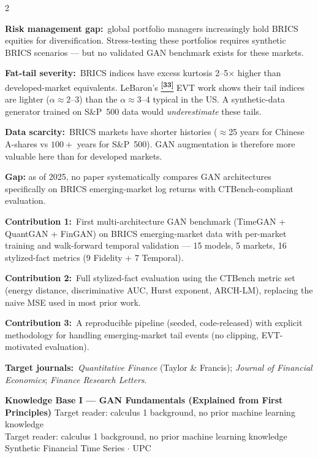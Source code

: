 \documentclass[10pt]{article}
\newcommand{\greenbox}[2]{\begin{tcolorbox}[mybox={FGreen}{GBg},title={#1}]#2\end{tcolorbox}}
\newcommand{\redbox}[2]{\begin{tcolorbox}[mybox={DRed}{RBg},title={#1}]#2\end{tcolorbox}}
\newcommand{\pagehead}[2]{%
  \begin{tcolorbox}[enhanced,arc=0pt,outer arc=0pt,boxrule=0pt,
    colback=Navy,colframe=Navy,
    top=5pt,bottom=5pt,left=8pt,right=8pt,
    before skip=0pt,after skip=10pt]
  {\color{white}\large\bfseries #1}%
  \ifx\relax#2\relax\else\\[1pt]{\color{blue!30!white}\small #2}\fi
  \hfill{\color{blue!20!white}\footnotesize Synthetic Financial Time Series $\cdot$ UPC}
  \end{tcolorbox}}
\newcommand{\tcite}[1]{%
  \hyperlink{R:#1}{\textsuperscript{\scriptsize\textbf{[#1]}}}}
\begin{document}
\begin{multicols}{2}
\columnbreak

\greenbox{Why BRICS? The Scientific Motivation}{%
\textbf{Risk management gap:}\ global portfolio managers increasingly hold BRICS equities for diversification. Stress-testing these portfolios requires synthetic BRICS scenarios --- but no validated GAN benchmark exists for these markets.

\smallskip
\textbf{Fat-tail severity:}\ BRICS indices have excess kurtosis 2--5$\times$ higher than developed-market equivalents. LeBaron's\tcite{33} EVT work shows their tail indices are lighter ($\alpha \approx 2$--$3$) than the $\alpha \approx 3$--$4$ typical in the US. A synthetic-data generator trained on S\&P~500 data would \emph{underestimate} these tails.

\smallskip
\textbf{Data scarcity:}\ BRICS markets have shorter histories ($\approx$25 years for Chinese A-shares vs $100+$ years for S\&P~500). GAN augmentation is therefore more valuable here than for developed markets.}

\redbox{Why This Study Is Publishable: The Journal Pitch}{%
\textbf{Gap:} as of 2025, no paper systematically compares GAN architectures specifically on BRICS emerging-market log returns with CTBench-compliant evaluation.

\textbf{Contribution 1:}\ First multi-architecture GAN benchmark (TimeGAN + QuantGAN + FinGAN) on BRICS emerging-market data with per-market training and walk-forward temporal validation --- 15 models, 5 markets, 16 stylized-fact metrics (9 Fidelity + 7 Temporal).

\textbf{Contribution 2:}\ Full stylized-fact evaluation using the CTBench metric set (energy distance, discriminative AUC, Hurst exponent, ARCH-LM), replacing the naive MSE used in most prior work.

\textbf{Contribution 3:}\ A reproducible pipeline (seeded, code-released) with explicit methodology for handling emerging-market tail events (no clipping, EVT-motivated evaluation).

\textbf{Target journals:}\ \textit{Quantitative Finance} (Taylor \& Francis); \textit{Journal of Financial Economics}; \textit{Finance Research Letters}.}

\end{multicols}

\clearpage

\pagehead{Knowledge Base I --- GAN Fundamentals (Explained from First Principles)}
         {Target reader: calculus 1 background, no prior machine learning knowledge}
\end{document}
